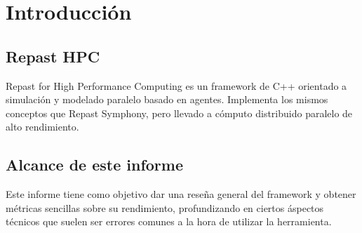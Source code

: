 \section{Introducción}

\subsection{Repast HPC}

Repast for High Performance Computing es un framework de C++ orientado a
simulación y modelado paralelo basado en agentes. Implementa los mismos
conceptos que Repast Symphony, pero llevado a cómputo distribuido
paralelo de alto rendimiento.

\subsection{Alcance de este informe}

Este informe tiene como objetivo dar una reseña general del framework y
obtener métricas sencillas sobre su rendimiento, profundizando en
ciertos áspectos técnicos que suelen ser errores comunes a la hora de
utilizar la herramienta.
